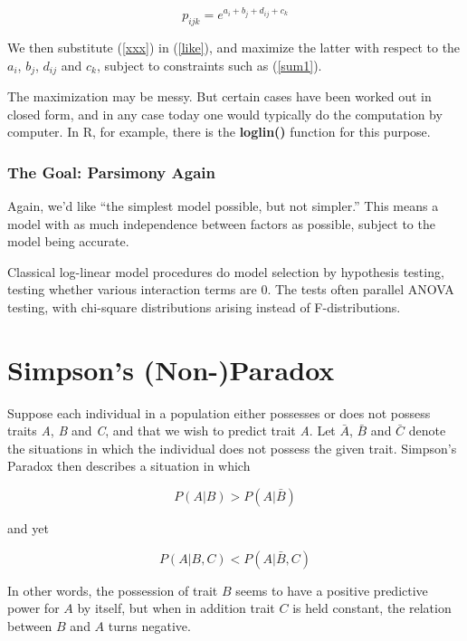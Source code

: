 \begin{equation}
\label{xxx}
p_{ijk} 
= e^{a_i + b_j + d_{ij} + c_k} 
\end{equation}

We then substitute (\ref{xxx}) in (\ref{like}), and maximize the latter
with respect to the $a_i$, $b_j$, $d_{ij}$ and $c_k$, subject to
constraints such as (\ref{sum1}).

The maximization may be messy.  But certain cases have been worked out
in closed form, and in any case today one would typically do the
computation by computer.  In R, for example, there is the {\bf loglin()}
function for this purpose.

\subsubsection{The Goal:  Parsimony Again}

Again, we'd like ``the simplest model possible, but not simpler.''  This 
means a model with as much independence between factors as possible,
subject to the model being accurate.

Classical log-linear model procedures do model selection by hypothesis
testing, testing whether various interaction terms are 0.  The tests
often parallel ANOVA testing, with chi-square distributions arising
instead of F-distributions.

\section{Simpson's (Non-)Paradox}

Suppose each individual in a population either possesses or does not
possess traits {\it A}, {\it  B} and {\it C}, and that we wish to
predict trait {\it A}.  Let $\bar{A}$, $\bar{B}$ and $\bar{C}$ denote
the situations in which the individual does not possess the given trait.
Simpson's Paradox then describes a situation in which

\begin{equation}
P(A|B) > P(A|\bar{B})
\end{equation}

\noindent and yet

\begin{equation}
P(A|B,C) < P(A|\bar{B},C)
\end{equation}

In other words, the possession of trait $B$ seems to have a positive
predictive power for $A$ by itself, but when in addition trait $C$ is
held constant, the relation between $B$ and $A$ turns negative.

